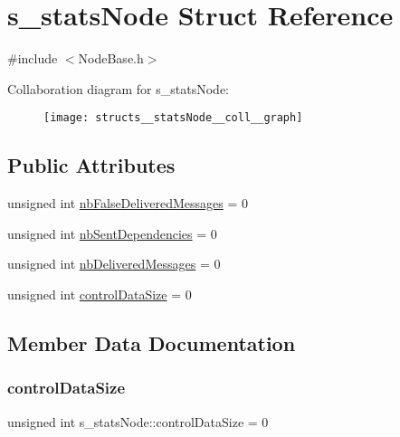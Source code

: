 \hypertarget{structs__statsNode}{}\section{s\+\_\+stats\+Node Struct Reference}
\label{structs__statsNode}


{\ttfamily \#include $<$Node\+Base.\+h$>$}



Collaboration diagram for s\+\_\+stats\+Node\+:\nopagebreak
\begin{figure}[H]
\begin{center}
\leavevmode
\texttt{[image: structs\_\_statsNode\_\_coll\_\_graph]}
\end{center}
\end{figure}
\subsection*{Public Attributes}
\begin{DoxyCompactItemize}
\item 
unsigned int \hyperlink{structs__statsNode_a009b1278ace8dbe831b9a3cdfef773e0}{nb\+False\+Delivered\+Messages} = 0
\item 
unsigned int \hyperlink{structs__statsNode_af01c78389a27c9eeff8033f6b3d3beee}{nb\+Sent\+Dependencies} = 0
\item 
unsigned int \hyperlink{structs__statsNode_a1e33dd5d17c1008ea127e4f86a7616e1}{nb\+Delivered\+Messages} = 0
\item 
unsigned int \hyperlink{structs__statsNode_aaffa71bc7f01bd767080163be60fbb50}{control\+Data\+Size} = 0
\end{DoxyCompactItemize}


\subsection{Member Data Documentation}
\mbox{\label{structs__statsNode_aaffa71bc7f01bd767080163be60fbb50}} 
\subsubsection{\texorpdfstring{control\+Data\+Size}{controlDataSize}}
{\footnotesize\ttfamily unsigned int s\+\_\+stats\+Node\+::control\+Data\+Size = 0}

